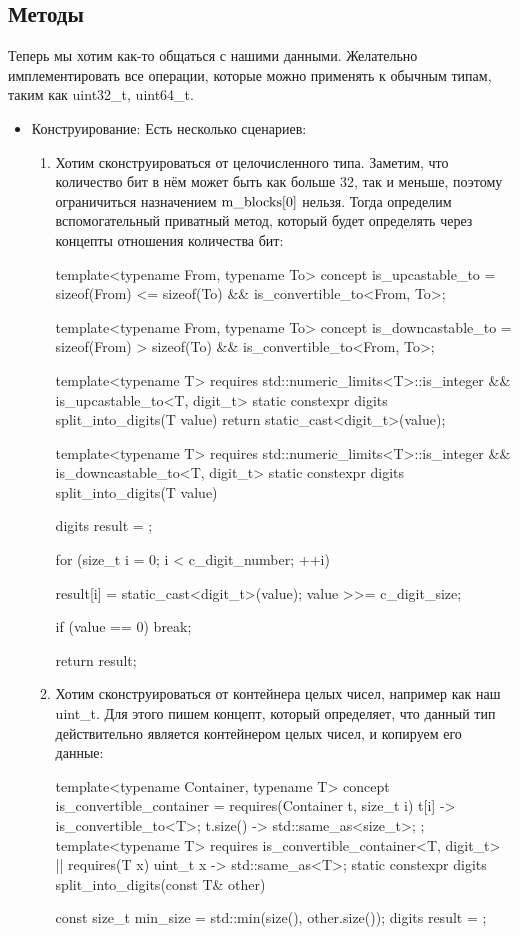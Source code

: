 \subsection{Методы}
Теперь мы хотим как-то общаться с нашими данными. Желательно имплементировать все операции, которые можно применять к обычным типам, таким как uint32\_t, uint64\_t. 
\begin{itemize}
  \item Конструирование:
    Есть несколько сценариев:
    \begin{enumerate}
      \item Хотим сконструироваться от целочисленного типа. Заметим, что количество бит в нём может быть как больше 32, так и меньше, поэтому ограничиться назначением $\rm m\_blocks[0]$ нельзя. Тогда определим вспомогательный приватный метод, который будет определять через концепты отношения количества бит:
      \begin{cppcode}
template<typename From, typename To>
concept is_upcastable_to = sizeof(From) <= sizeof(To) && is_convertible_to<From, To>;

template<typename From, typename To>
concept is_downcastable_to = sizeof(From) > sizeof(To) && is_convertible_to<From, To>;

template<typename T>
requires std::numeric_limits<T>::is_integer && is_upcastable_to<T, digit_t>
static constexpr digits split_into_digits(T value) {
    return {static_cast<digit_t>(value)};
}

template<typename T>
requires std::numeric_limits<T>::is_integer && is_downcastable_to<T, digit_t>
static constexpr digits split_into_digits(T value) {
    digits result = {};

    for (size_t i = 0; i < c_digit_number; ++i) {
        result[i] = static_cast<digit_t>(value);
        value >>= c_digit_size;

        if (value == 0) {
            break;
        }
    }

    return result;
}
      \end{cppcode}
      \item Хотим сконструироваться от контейнера целых чисел, например как наш uint\_t. Для этого пишем концепт, который определяет, что данный тип действительно является контейнером целых чисел, и копируем его данные:
      \begin{cppcode}
template<typename Container, typename T>
concept is_convertible_container = requires(Container t, size_t i) {
    { t[i] } -> is_convertible_to<T>;
    { t.size() } -> std::same_as<size_t>;
};
        template<typename T>
requires is_convertible_container<T, digit_t> || requires(T x) {
    { uint_t {x} } -> std::same_as<T>;
}
static constexpr digits split_into_digits(const T& other) {
    const size_t min_size = std::min(size(), other.size());
    digits result = {};

}
\end{cppcode}
\end{enumerate}
\end{itemize}
